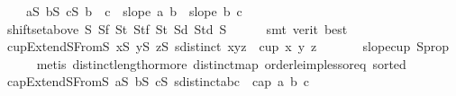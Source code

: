 \begin{isabellebody}
\ \ \ \ {\isachardoublequoteopen}{\isasymforall}a{\isasymin}S{}{\isachardot}{\kern0pt}\ {\isasymforall}b{\isasymin}S{}{\isachardot}{\kern0pt}\ {\isasymforall}c{\isasymin}S{}{\isachardot}{\kern0pt}\ b\ {\isacharless}{\kern0pt}\ c\ {\isasymlongrightarrow}\ slope\ a\ b\ {\isachargreater}{\kern0pt}\ slope\ b\ c{\isachardoublequoteclose}\isanewline
\ \ \ \ \isamarkupfalse%
\ shift{\isacharunderscore}{\kern0pt}set{\isacharunderscore}{\kern0pt}above\ S{}{\isacharparenleft}{\kern0pt}{}{\isacharparenright}{\kern0pt}\ S{}f\ S{}t{\isacharparenleft}{\kern0pt}{}{\isacharparenright}{\kern0pt}\ S{}tf\ S{}t{}\ S{}d\ S{}td\ S{}{}\isanewline
\ \ \ \ \isamarkupfalse%
\ {\isacharparenleft}{\kern0pt}smt\ {\isacharparenleft}{\kern0pt}verit{\isacharcomma}{\kern0pt}\ best{\isacharparenright}{\kern0pt}{\isacharparenright}{\kern0pt}\isanewline
\isanewline
\ \ \isamarkupfalse%
\ cupExtendS{}FromS{}{\isacharcolon}{\kern0pt}\ {\isachardoublequoteopen}{\isasymforall}x{\isasymin}S{}{\isachardot}{\kern0pt}\ {\isasymforall}y{\isasymin}S{}{\isachardot}{\kern0pt}\ {\isasymforall}z{\isasymin}S{}{\isachardot}{\kern0pt}\ {\isacharparenleft}{\kern0pt}sdistinct\ {\isacharbrackleft}{\kern0pt}x{\isacharcomma}{\kern0pt}y{\isacharcomma}{\kern0pt}z{\isacharbrackright}{\kern0pt}\ {\isasymlongrightarrow}\ cup{}\ x\ y\ z{\isacharparenright}{\kern0pt}{\isachardoublequoteclose}\ \isanewline
\ \ \ \ \isamarkupfalse%
\ slope{\isacharunderscore}{\kern0pt}cup{}\ S{}{\isacharunderscore}{\kern0pt}prop\isanewline
\ \ \ \ \isamarkupfalse%
\ {\isacharparenleft}{\kern0pt}metis\ distinct{\isacharunderscore}{\kern0pt}length{\isacharunderscore}{\kern0pt}{}{\isacharunderscore}{\kern0pt}or{\isacharunderscore}{\kern0pt}more\ distinct{\isacharunderscore}{\kern0pt}map\ order{\isacharunderscore}{\kern0pt}le{\isacharunderscore}{\kern0pt}imp{\isacharunderscore}{\kern0pt}less{\isacharunderscore}{\kern0pt}or{\isacharunderscore}{\kern0pt}eq\ sorted{}{\isacharparenright}{\kern0pt}\isanewline
\ \ \isamarkupfalse%
\ capExtendS{}FromS{}{\isacharcolon}{\kern0pt}\ {\isachardoublequoteopen}{\isasymforall}a{\isasymin}S{}{\isachardot}{\kern0pt}\ {\isasymforall}b{\isasymin}S{}{\isachardot}{\kern0pt}\ {\isasymforall}c{\isasymin}S{}{\isachardot}{\kern0pt}\ {\isacharparenleft}{\kern0pt}sdistinct{\isacharbrackleft}{\kern0pt}a{\isacharcomma}{\kern0pt}b{\isacharcomma}{\kern0pt}c{\isacharbrackright}{\kern0pt}\ {\isasymlongrightarrow}\ cap{}\ a\ b\ c{\isacharparenright}{\kern0pt}{\isachardoublequoteclose}\ \isanewline

\end{isabellebody}
